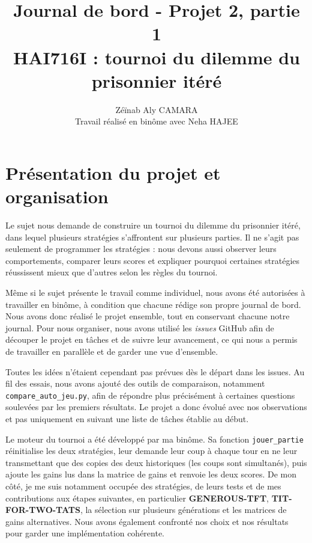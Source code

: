 \documentclass[10pt,a4paper]{article}
\title{Journal de bord - Projet 2, partie 1\\HAI716I : tournoi du dilemme du prisonnier itéré}
\author{Zéïnab Aly CAMARA\\{\small Travail réalisé en binôme avec Neha HAJEE}}
\date{}
\begin{document}
\maketitle

\section{Présentation du projet et organisation}

Le sujet nous demande de construire un tournoi du dilemme du prisonnier itéré, dans lequel plusieurs stratégies s'affrontent
sur plusieurs parties. Il ne s'agit pas seulement de programmer les stratégies : nous devons aussi observer leurs
comportements, comparer leurs scores et expliquer pourquoi certaines stratégies réussissent mieux que d'autres selon les
règles du tournoi.

Même si le sujet présente le travail comme individuel, nous avons été autorisées à travailler en binôme, à condition
que chacune rédige son propre journal de bord. Nous avons donc réalisé le projet ensemble, tout en conservant chacune notre
journal. Pour nous organiser, nous avons utilisé les \textit{issues} GitHub afin de découper le projet en tâches et de suivre
leur avancement, ce qui nous a permis de travailler en parallèle et de garder une vue d'ensemble.

Toutes les idées n'étaient cependant pas prévues dès le départ dans les issues. Au fil des essais, nous avons ajouté des outils
de comparaison, notamment \texttt{compare\_auto\_jeu.py}, afin de répondre plus précisément à certaines questions soulevées
par les premiers résultats. Le projet a donc évolué avec nos observations et pas uniquement en suivant une liste de tâches
établie au début.

Le moteur du tournoi a été développé par ma binôme. Sa fonction \texttt{jouer\_partie} réinitialise les deux stratégies, leur
demande leur coup à chaque tour en ne leur transmettant que des copies des deux historiques (les coups sont simultanés), puis
ajoute les gains lus dans la matrice de gains et renvoie les deux scores. De mon côté, je me suis notamment occupée des
stratégies, de leurs tests et de mes contributions aux étapes suivantes, en particulier \textbf{GENEROUS-TFT},
\textbf{TIT-FOR-TWO-TATS}, la sélection sur plusieurs générations et les matrices de gains alternatives. Nous avons également
confronté nos choix et nos résultats pour garder une implémentation cohérente.
\end{document}
